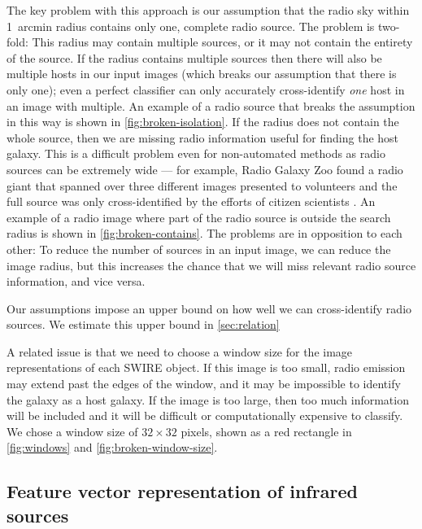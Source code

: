 \documentclass[fleqn,usenatbib,usedcolumn]{mnras}
\begin{document}
    The key problem with this approach is our assumption that the radio sky
    within 1~arcmin radius contains only one, complete radio source. The problem
    is two-fold: This radius may contain multiple sources, or it may not contain
    the entirety of the source. If the radius contains multiple sources then
    there will also be multiple hosts in our input images (which breaks our
    assumption that there is only one); even a perfect classifier can only
    accurately cross-identify \emph{one} host in an image with multiple. An
    example of a radio source that breaks the assumption in this way is shown in
    \autoref{fig:broken-isolation}. If the radius does not contain the whole
    source, then we are missing radio information useful for finding the host
    galaxy. This is a difficult problem even for non-automated methods as radio
    sources can be extremely wide --- for example, Radio Galaxy Zoo found a
    radio giant that spanned over three different images presented to volunteers
    and the full source was only cross-identified by the efforts of citizen
    scientists \citep{banfield15}. An example of a radio image where part of the
    radio source is outside the search radius is shown in
    \autoref{fig:broken-contains}. The problems are in opposition to each other:
    To reduce the number of sources in an input image, we can reduce the image
    radius, but this increases the chance that we will miss relevant radio
    source information, and vice versa.

    Our assumptions impose an upper bound on how well we can cross-identify
    radio sources. We estimate this upper bound in \autoref{sec:relation}

    A related issue is that we need to choose a window size for the image
    representations of each SWIRE object. If this image is too small, radio
    emission may extend past the edges of the window, and it may be impossible
    to identify the galaxy as a host galaxy. If the image is too large, then
    too much information will be included and it will be difficult or
    computationally expensive to classify. We chose a window size of $32
    \times 32$ pixels, shown as a red rectangle in
    \autoref{fig:windows} and \autoref{fig:broken-window-size}.

  \subsection{Feature vector representation of infrared sources}
  \label{vector-representation-of-infrared-sources}
\end{document}
